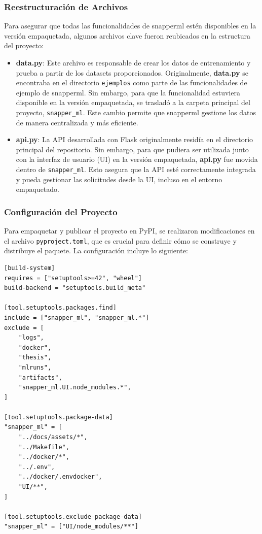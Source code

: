 \subsubsection{Reestructuración de Archivos}
Para asegurar que todas las funcionalidades de \Gls{snapperml} estén disponibles en la versión empaquetada, algunos archivos clave fueron reubicados en la estructura del proyecto:

\begin{itemize}
    \item \textbf{data.py}: Este archivo es responsable de crear los datos de entrenamiento y prueba a partir de los datasets proporcionados. Originalmente, \textbf{data.py} se encontraba en el directorio \texttt{ejemplos} como parte de las funcionalidades de ejemplo de \Gls{snapperml}. Sin embargo, para que la funcionalidad estuviera disponible en la versión empaquetada, se trasladó a la carpeta principal del proyecto, \texttt{snapper\_ml}. Este cambio permite que \Gls{snapperml} gestione los datos de manera centralizada y más eficiente.
    \item \textbf{api.py}: La API desarrollada con Flask originalmente residía en el directorio principal del repositorio. Sin embargo, para que pudiera ser utilizada junto con la interfaz de usuario (UI) en la versión empaquetada, \textbf{api.py} fue movida dentro de \texttt{snapper\_ml}. Esto asegura que la API esté correctamente integrada y pueda gestionar las solicitudes desde la UI, incluso en el entorno empaquetado.
\end{itemize}

\subsubsection{Configuración del Proyecto}
Para empaquetar y publicar el proyecto en PyPI, se realizaron modificaciones en el archivo \texttt{pyproject.toml}, que es crucial para definir cómo se construye y distribuye el paquete. La configuración incluye lo siguiente:
\begin{verbatim}
[build-system]
requires = ["setuptools>=42", "wheel"]
build-backend = "setuptools.build_meta"

[tool.setuptools.packages.find]
include = ["snapper_ml", "snapper_ml.*"]
exclude = [
    "logs",
    "docker",
    "thesis",
    "mlruns",
    "artifacts",
    "snapper_ml.UI.node_modules.*",
]

[tool.setuptools.package-data]
"snapper_ml" = [
    "../docs/assets/*",
    "../Makefile",
    "../docker/*",
    "../.env",
    "../docker/.envdocker",
    "UI/**",
]

[tool.setuptools.exclude-package-data]
"snapper_ml" = ["UI/node_modules/**"]
\end{verbatim}

